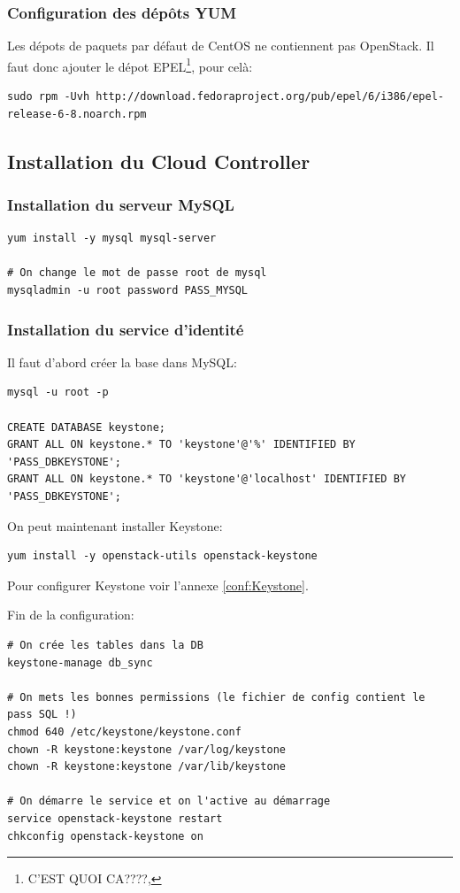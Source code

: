 \documentclass[a4paper,oneside]{report}
\begin{document}
\subsubsection{Configuration des dépôts YUM}
Les dépots de paquets par défaut de CentOS ne contiennent pas OpenStack. Il faut donc ajouter le dépot EPEL\footnote{C'EST QUOI CA????,}, pour celà:
\begin{verbatim}
sudo rpm -Uvh http://download.fedoraproject.org/pub/epel/6/i386/epel-release-6-8.noarch.rpm
\end{verbatim}

\subsection{Installation du Cloud Controller}
\subsubsection{Installation du serveur MySQL}
\begin{verbatim}
yum install -y mysql mysql-server

# On change le mot de passe root de mysql
mysqladmin -u root password PASS_MYSQL
\end{verbatim}
\subsubsection{Installation du service d'identité}
Il faut d'abord créer la base dans MySQL:
\begin{verbatim}
mysql -u root -p

CREATE DATABASE keystone;
GRANT ALL ON keystone.* TO 'keystone'@'%' IDENTIFIED BY 'PASS_DBKEYSTONE';
GRANT ALL ON keystone.* TO 'keystone'@'localhost' IDENTIFIED BY 'PASS_DBKEYSTONE';
\end{verbatim}

On peut maintenant installer Keystone:
\begin{verbatim}
yum install -y openstack-utils openstack-keystone
\end{verbatim}

Pour configurer Keystone voir l'annexe \ref{conf:Keystone}.

Fin de la configuration:
\begin{verbatim} 
# On crée les tables dans la DB
keystone-manage db_sync

# On mets les bonnes permissions (le fichier de config contient le pass SQL !)
chmod 640 /etc/keystone/keystone.conf 
chown -R keystone:keystone /var/log/keystone
chown -R keystone:keystone /var/lib/keystone

# On démarre le service et on l'active au démarrage
service openstack-keystone restart
chkconfig openstack-keystone on
\end{verbatim}
\end{document}
